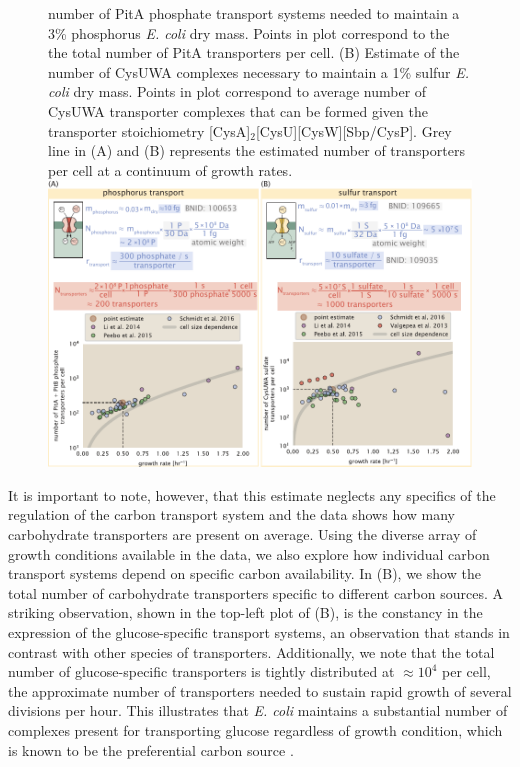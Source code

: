 \begin{figure}
\begin{fullwidth}
{    number of PitA phosphate transport systems needed to maintain a 3\%
    phosphorus \textit{E. coli} dry mass. Points in plot correspond to
    the the total number of PitA transporters per cell. (B) Estimate of
    the number of CysUWA complexes necessary to maintain a 1\% sulfur
    \textit{E. coli} dry mass. Points in plot correspond to average
    number of CysUWA transporter complexes that can be formed given the
    transporter stoichiometry [CysA]$_2$[CysU][CysW][Sbp/CysP]. Grey line
    in (A) and (B) represents the estimated number of transporters per
    cell at a continuum of growth rates.}{\includegraphics{main_figs/fig3_phospho_sulfo_transport.pdf}}\label{figsupp:phospho_sulfo}
    \end{fullwidth}
\end{figure}

It is important to note, however, that this estimate neglects any specifics of the
regulation of the carbon transport system and the data shows how many
carbohydrate transporters are present on average. Using the diverse array of
growth conditions available in the data, we also explore how individual carbon
transport systems depend on specific carbon availability. In
(B), we show the total number of carbohydrate transporters
specific to different carbon sources. A striking observation, shown in the
top-left plot of (B), is the constancy in the expression of
the glucose-specific transport systems, an observation that stands in contrast
with other species of transporters. Additionally, we note that the total
number of glucose-specific transporters is tightly distributed at $\approx 10^4$
per cell, the approximate number of transporters needed to sustain rapid growth
of several divisions per hour. This illustrates that \textit{E. coli} maintains
a substantial number of complexes present for transporting glucose regardless of
growth condition, which is known to be the preferential carbon source
\citep{monod1947, liu2005a, aidelberg2014}.

